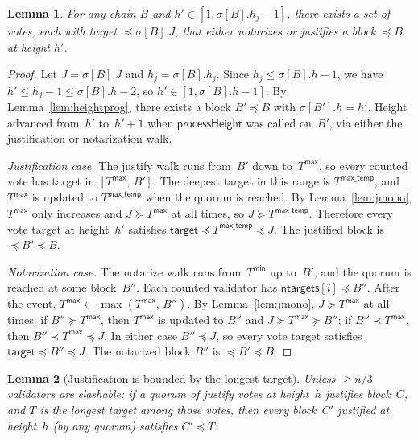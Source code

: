 \documentclass{article}
\newcommand{\ntargets}{\mathsf{ntargets}}
\theoremstyle{plain}
\newtheorem{lemma}{Lemma}
\theoremstyle{definition}
\theoremstyle{remark}
\begin{document}
\begin{lemma}\label{lem:witnessed}
  For any chain $B$ and $h' \in [1, \sigma[B].h_j-1]$, there exists a set of votes, each with target $\preceq \sigma[B].J$, that either notarizes or justifies a block $\preceq B$ at height $h'$.
\end{lemma}

\begin{proof}
Let $J = \sigma[B].J$ and $h_j = \sigma[B].h_j$.
Since $h_j \leq \sigma[B].h - 1$, we have $h' \leq h_j - 1 \leq \sigma[B].h - 2$, so $h' \in [1, \sigma[B].h - 1]$.
By Lemma~\ref{lem:heightprog}, there exists a block $B' \preceq B$ with $\sigma[B'].h = h'$.
Height advanced from~$h'$ to~$h'+1$ when $\textsf{processHeight}$ was called on~$B'$, via either the justification or notarization walk.

\emph{Justification case.}
The justify walk runs from~$B'$ down to~$T^\mathsf{max}$, so every counted vote has target in $[T^\mathsf{max},\, B']$.
The deepest target in this range is $T^\mathsf{max\_temp}$, and $T^\mathsf{max}$ is updated to $T^\mathsf{max\_temp}$ when the quorum is reached.
By Lemma~\ref{lem:jmono}, $T^\mathsf{max}$ only increases and $J \succeq T^\mathsf{max}$ at all times, so $J \succeq T^\mathsf{max\_temp}$.
Therefore every vote target at height~$h'$ satisfies $\mathsf{target} \preceq T^\mathsf{max\_temp} \preceq J$.
The justified block is $\preceq B' \preceq B$.

\emph{Notarization case.}
The notarize walk runs from~$T^\mathsf{min}$ up to~$B'$, and the quorum is reached at some block~$B''$.
Each counted validator has $\ntargets[i] \preceq B''$.
After the event, $T^\mathsf{max} \gets \max(T^\mathsf{max},\, B'')$.
By Lemma~\ref{lem:jmono}, $J \succeq T^\mathsf{max}$ at all times: if $B'' \succeq T^\mathsf{max}$, then $T^\mathsf{max}$ is updated to $B''$ and $J \succeq T^\mathsf{max} \succeq B''$; if $B'' \prec T^\mathsf{max}$, then $B'' \prec T^\mathsf{max} \preceq J$.
In either case $B'' \preceq J$, so every vote target satisfies $\mathsf{target} \preceq B'' \preceq J$.
The notarized block $B''$ is $\preceq B' \preceq B$.
\end{proof}

\begin{lemma}[Justification is bounded by the longest target]\label{lem:justbound}
Unless $\geq n/3$ validators are slashable: if a quorum of justify votes at height~$h$ justifies block~$C$, and $T$ is the longest target among those votes, then every block~$C'$ justified at height~$h$ (by any quorum) satisfies $C' \preceq T$.
\end{lemma}
\end{document}
